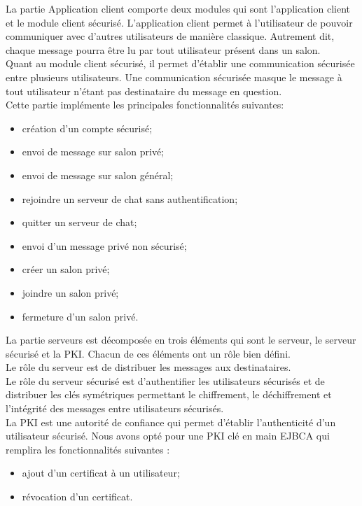 \documentclass[a4paper,11pt,french]{book}
\begin{document}
La partie Application client comporte deux modules qui sont l'application client et le module client sécurisé. L'application client permet à l'utilisateur de pouvoir communiquer avec d'autres utilisateurs de manière classique. Autrement dit, chaque message pourra être lu par tout utilisateur présent dans un salon.\\Quant au module client sécurisé, il permet d'établir une communication sécurisée entre plusieurs utilisateurs. Une communication sécurisée masque le message à tout utilisateur n'étant pas destinataire du message en question. \\Cette partie implémente les principales fonctionnalités suivantes:
\begin{itemize}
\item création d’un compte sécurisé;
\item envoi de message sur salon privé;
\item envoi de message sur salon général;
\item rejoindre un serveur de chat sans authentification;
\item quitter un serveur de chat;
\item envoi d’un message privé non sécurisé;
\item créer un salon privé;
\item joindre un salon privé;
\item fermeture d’un salon privé.
\end{itemize}
\vspace{.6cm}

La partie serveurs est décomposée en trois éléments qui sont le serveur, le serveur sécurisé et la PKI. Chacun de ces éléments ont un rôle bien défini. \\Le rôle du serveur est de distribuer les messages aux destinataires.\\Le rôle du serveur sécurisé est d'authentifier les utilisateurs sécurisés et de distribuer les clés symétriques permettant le chiffrement, le déchiffrement et l'intégrité des messages entre utilisateurs sécurisés.\\La PKI est une autorité de confiance qui permet d'établir l'authenticité d'un utilisateur sécurisé. Nous avons opté pour une PKI clé en main EJBCA qui remplira les fonctionnalités suivantes :
\begin{itemize}
\item ajout d'un certificat à un utilisateur;
\item révocation d’un certificat.
\end{itemize}
\vspace{.6cm}
\end{document}
